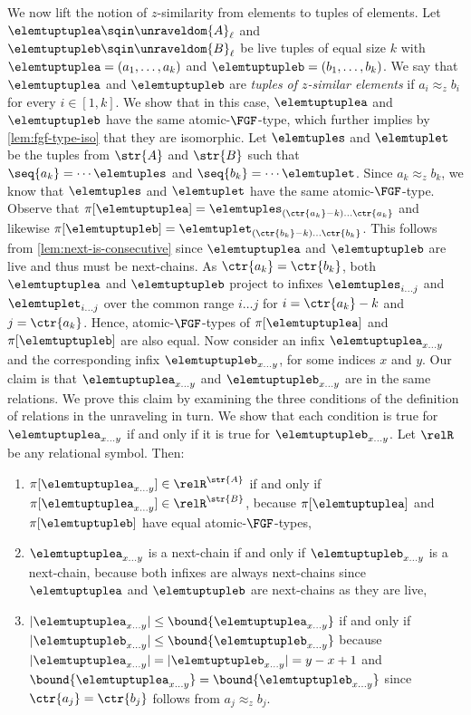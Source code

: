 We now lift the notion of $z$-similarity from elements to tuples of elements.
Let $\elemtuptuplea \sqin \unraveldom{A}_{\ell}$ and $\elemtuptupleb \sqin \unraveldom{B}_{\ell}$ be live tuples of equal size $k$ with $\elemtuptuplea = (a_{1}, \ldots, a_{k})$ and $\elemtuptupleb = (b_{1}, \ldots, b_{k})$.
We say that $\elemtuptuplea$ and $\elemtuptupleb$ are \emph{tuples of $z$-similar elements} if $a_{i} \approx_{z} b_{i}$ for every $i \in [1,k]$.
We show that in this case, $\elemtuptuplea$ and $\elemtuptupleb$ have the same atomic-$\FGF$-type, which further implies by \cref{lem:fgf-type-iso} that they are isomorphic.
Let $\elemtuples$ and $\elemtuplet$ be the tuples from $\str{A}$ and $\str{B}$ such that $\seq{a_{k}} = \cdots \elemtuples$ and $\seq{b_{k}} = \cdots \elemtuplet$.
Since $a_{k} \approx_z b_{k}$, we know that $\elemtuples$ and $\elemtuplet$ have the same atomic-$\FGF$-type.
Observe that $\pi[\elemtuptuplea] = \elemtuples_{(\ctr{a_{k}}-k)\ldots{}\ctr{a_{k}}}$ and likewise $\pi[\elemtuptupleb] = \elemtuplet_{(\ctr{b_{k}}-k)\ldots{}\ctr{b_{k}}}$.
This follows from \cref{lem:next-is-consecutive} since $\elemtuptuplea$ and $\elemtuptupleb$ are live and thus must be next-chains.
As $\ctr{a_{k}} = \ctr{b_{k}}$, both $\elemtuptuplea$ and $\elemtuptupleb$ project to infixes $\elemtuples_{i\ldots{}j}$ and $\elemtuplet_{i\ldots{}j}$ over the common range $i\ldots{}j$ for $i = \ctr{a_{k}} - k$ and $j = \ctr{a_{k}}$.
Hence, atomic-$\FGF$-types of $\pi[\elemtuptuplea]$ and $\pi[\elemtuptupleb]$ are also equal.
Now consider an infix $\elemtuptuplea_{x\ldots{}y}$ and the corresponding infix $\elemtuptupleb_{x\ldots{}y}$, for some indices $x$ and $y$.
Our claim is that $\elemtuptuplea_{x\ldots{}y}$ and $\elemtuptupleb_{x\ldots{}y}$ are in the same relations.
We prove this claim by examining the three conditions of the definition of relations in the unraveling in turn.
We show that each condition is true for $\elemtuptuplea_{x\ldots{}y}$ if and only if it is true for $\elemtuptupleb_{x\ldots{}y}$.
Let $\relR$ be any relational symbol. Then:
\begin{enumerate}
  \item $\pi[\elemtuptuplea_{x\ldots{}y}] \in \relR^{\str{A}}$ if and only if $\pi[\elemtuptuplea_{x\ldots{}y}] \in \relR^{\str{B}}$, because $\pi[\elemtuptuplea]$ and $\pi[\elemtuptupleb]$ have equal atomic-$\FGF$-types,
  \item $\elemtuptuplea_{x\ldots{}y}$ is a next-chain if and only if $\elemtuptupleb_{x\ldots{}y}$ is a next-chain, because both infixes are always next-chains since $\elemtuptuplea$ and $\elemtuptupleb$ are next-chains as they are live,
  \item $|\elemtuptuplea_{x\ldots{}y}| \le \bound{\elemtuptuplea_{x\ldots{}y}}$ if and only if $|\elemtuptupleb_{x\ldots{}y}| \le \bound{\elemtuptupleb_{x\ldots{}y}}$ because $|\elemtuptuplea_{x\ldots{}y}| = |\elemtuptupleb_{x\ldots{}y}| = y-x+1$ and $\bound{\elemtuptuplea_{x\ldots{}y}} = \bound{\elemtuptupleb_{x\ldots{}y}}$ since $\ctr{a_{j}} = \ctr{b_{j}}$ follows from $a_{j} \approx_{z} b_{j}$.
\end{enumerate}
